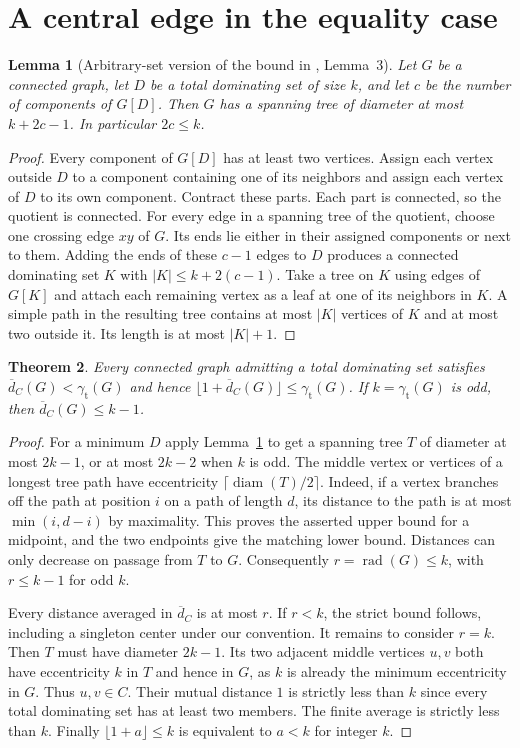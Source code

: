 \documentclass[11pt]{article}
\newtheorem{thm}{Theorem}[section]
\newtheorem{lem}[thm]{Lemma}
\newcommand{\gt}{\gamma_{\mathrm t}}
\newcommand{\rad}{\operatorname{rad}}
\newcommand{\diam}{\operatorname{diam}}
\newcommand{\av}{\overline d_C}
\begin{document}
\section{A central edge in the equality case}
\begin{lem}[Arbitrary-set version of the bound in \cite{dlpww}, Lemma~3]\label{lem:spine}
Let $G$ be a connected graph, let $D$ be a total dominating set of size $k$, and let $c$ be the
number of components of $G[D]$. Then $G$ has a spanning tree of diameter at
most $k+2c-1$. In particular $2c\le k$.
\end{lem}
\begin{proof}
Every component of $G[D]$ has at least two vertices. Assign each vertex
outside $D$ to a component containing one of its neighbors and assign each
vertex of $D$ to its own component. Contract these parts. Each part is
connected, so the quotient is connected. For every edge in a spanning tree
of the quotient, choose one crossing edge $xy$ of $G$. Its ends lie either
in their assigned components or next to them. Adding the ends of these
$c-1$ edges to $D$ produces a connected dominating set $K$ with
$|K|\le k+2(c-1)$. Take a tree on $K$ using edges of $G[K]$ and attach
each remaining vertex as a leaf at one of its neighbors in $K$. A simple
path in the resulting tree contains at most $|K|$ vertices of $K$ and at most
two outside it. Its length is at most $|K|+1$.
\end{proof}

\begin{thm}\label{thm:268}
Every connected graph admitting a total dominating set satisfies
$\av(G)<\gt(G)$ and hence $\lfloor1+\av(G)\rfloor\le\gt(G)$.
If $k=\gt(G)$ is odd, then $\av(G)\le k-1$.
\end{thm}
\begin{proof}
For a minimum $D$ apply Lemma~\ref{lem:spine} to get a spanning tree $T$ of
diameter at most $2k-1$, or at most $2k-2$ when $k$ is odd.
The middle vertex or vertices of a longest tree path have eccentricity
$\lceil\diam(T)/2\rceil$. Indeed, if a vertex branches off the path at
position $i$ on a path of length $d$, its distance to the path is at most
$\min(i,d-i)$ by maximality. This proves the asserted upper bound for a
midpoint, and the two endpoints give the matching lower bound.
Distances can only decrease on passage from $T$ to $G$. Consequently
$r=\rad(G)\le k$, with $r\le k-1$ for odd $k$.

Every distance averaged in $\av$ is at most $r$. If $r<k$, the strict bound follows, including a singleton center under our convention. It remains to consider
$r=k$. Then $T$ must have diameter $2k-1$. Its two adjacent middle
vertices $u,v$ both have eccentricity $k$ in $T$ and hence in $G$,
as $k$ is already the minimum eccentricity in $G$. Thus $u,v\in C$.
Their mutual distance $1$ is strictly less than $k$ since every total
dominating set has at least two members. The finite average is strictly
less than $k$.
Finally $\lfloor 1+a\rfloor\le k$ is equivalent to $a<k$ for integer $k$.
\end{proof}
\end{document}
